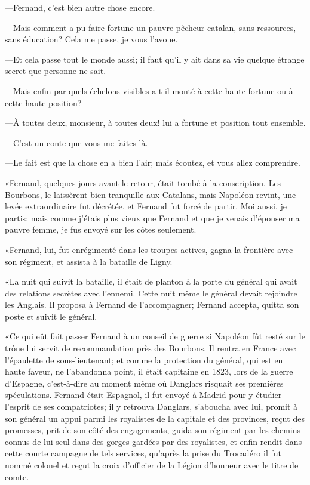 —Fernand, c'est bien autre chose encore.

—Mais comment a pu faire fortune un pauvre pêcheur catalan, sans ressources, sans éducation? Cela me passe, je vous l'avoue.

—Et cela passe tout le monde aussi; il faut qu'il y ait dans sa vie quelque étrange secret que personne ne sait.

—Mais enfin par quels échelons visibles a-t-il monté à cette haute fortune ou à cette haute position?

—À toutes deux, monsieur, à toutes deux! lui a fortune et position tout ensemble.

—C'est un conte que vous me faites là.

—Le fait est que la chose en a bien l'air; mais écoutez, et vous allez comprendre.

«Fernand, quelques jours avant le retour, était tombé à la conscription. Les Bourbons, le laissèrent bien tranquille aux Catalans, mais Napoléon revint, une levée extraordinaire fut décrétée, et Fernand fut forcé de partir. Moi aussi, je partis; mais comme j'étais plus vieux que Fernand et que je venais d'épouser ma pauvre femme, je fus envoyé sur les côtes seulement.

«Fernand, lui, fut enrégimenté dans les troupes actives, gagna la frontière avec son régiment, et assista à la bataille de Ligny.

«La nuit qui suivit la bataille, il était de planton à la porte du général qui avait des relations secrètes avec l'ennemi. Cette nuit même le général devait rejoindre les Anglais. Il proposa à Fernand de l'accompagner; Fernand accepta, quitta son poste et suivit le général.

«Ce qui eût fait passer Fernand à un conseil de guerre si Napoléon fût resté sur le trône lui servit de recommandation près des Bourbons. Il rentra en France avec l'épaulette de sous-lieutenant; et comme la protection du général, qui est en haute faveur, ne l'abandonna point, il était capitaine en 1823, lors de la guerre d'Espagne, c'est-à-dire au moment même où Danglars risquait ses premières spéculations. Fernand était Espagnol, il fut envoyé à Madrid pour y étudier l'esprit de ses compatriotes; il y retrouva Danglars, s'aboucha avec lui, promit à son général un appui parmi les royalistes de la capitale et des provinces, reçut des promesses, prit de son côté des engagements, guida son régiment par les chemins connus de lui seul dans des gorges gardées par des royalistes, et enfin rendit dans cette courte campagne de tels services, qu'après la prise du Trocadéro il fut nommé colonel et reçut la croix d'officier de la Légion d'honneur avec le titre de comte.

